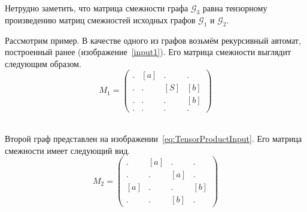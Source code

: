 Нетрудно заметить, что матрица смежности графа $\mathcal{G}_3$ равна тензорному произведению матриц смежностей исходных графов $\mathcal{G}_1$ и $\mathcal{G}_2$.

\begin{example}
Рассмотрим пример.
В качестве одного из графов возьмём рекурсивный автомат, построенный ранее (изображение~\ref{input1}).
Его матрица смежности выглядит следующим образом.
\[ M_1 =
\begin{pmatrix}
. & [a] & . & . \\
. & . & [S] & [b] \\
. & . & . & [b] \\
. & . & . & .
\end{pmatrix}
\]

\begin{align}
\label{eq:TensorProductInput}
    
\end{align}

Второй граф представлен на изображении~\ref{eq:TensorProductInput}.
Его матрица смежности имеет следующий вид.
\[ M_2 =
\begin{pmatrix}
. & [a] & . & . \\
. & . & [a] & . \\
[a] & . & . & [b] \\
. & . & [b] & .
\end{pmatrix}
\]


\end{example}
